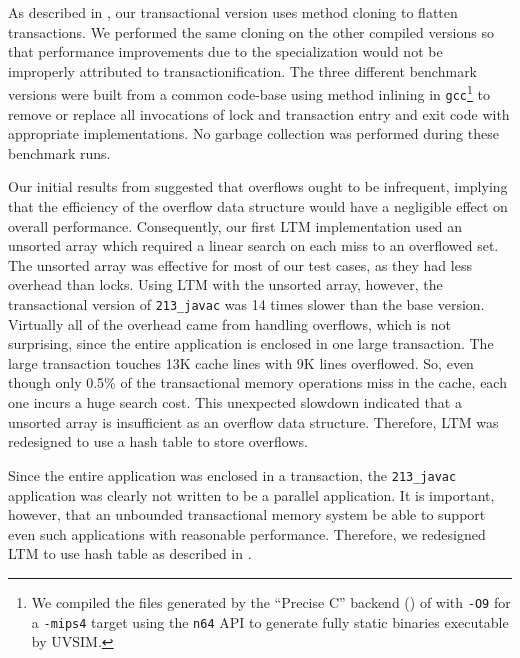 As described in , our transactional version uses method
cloning to flatten transactions.  We performed the same cloning on the
other compiled versions so that performance improvements due to the
specialization would not be improperly attributed to
transactionification.  The three different benchmark versions were
built from a common code-base using method inlining in \texttt{gcc}\footnote{We
compiled the files generated by the ``Precise C'' backend
() of \flex with
\texttt{-O9} for a \texttt{-mips4} target using the
\texttt{n64} API to generate fully static binaries executable by
UVSIM\@.}  to remove or replace all invocations of lock and transaction
entry and exit code with appropriate implementations.  No garbage
collection was performed during these benchmark runs.

\label{sec:javac}
Our initial results from  suggested that
overflows ought to be infrequent, implying that the efficiency of the overflow
data structure would 
have a negligible effect on overall performance.  Consequently, our first
LTM implementation used an unsorted array which required a linear
search on each miss to an overflowed set. The unsorted array was
effective for most of our test cases, as they had less overhead than
locks.  Using LTM with the unsorted array, however, the transactional
version of \texttt{213\_javac} was 14 times slower than the base
version.  Virtually all of the overhead came from handling overflows,
which is not surprising, since the entire application is enclosed in
one large transaction. The large transaction touches 13K cache lines
with 9K lines overflowed.  So, even though only 0.5\% of the
transactional memory operations miss in the cache, each one incurs a
huge search cost. This unexpected slowdown indicated that a \naive
unsorted array is insufficient as an overflow data
structure. Therefore, LTM was redesigned to use a hash table to store
overflows.

Since the entire application was enclosed in a transaction, the
\texttt{213\_javac} application was clearly not written to be a
parallel application.  It is important, however, that an unbounded
transactional memory system be able to support even such applications
with reasonable performance. Therefore, we redesigned LTM to use hash
table as described in .


